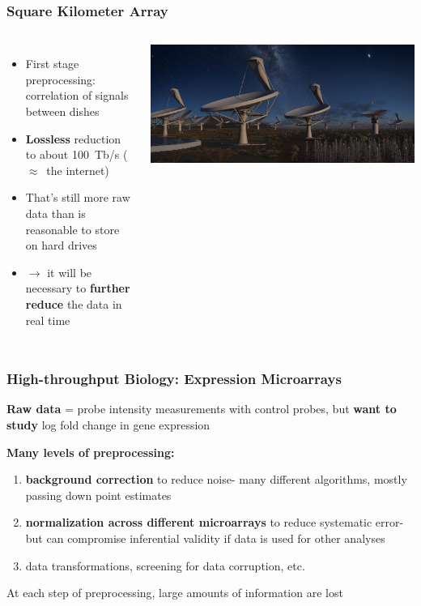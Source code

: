 \documentclass[10pt, compress]{beamer}
\begin{document}
\begin{frame}[fragile]
    \frametitle{Square Kilometer Array}
    \begin{columns}
    		\begin{itemize}
        		\item First stage preprocessing: correlation of signals between dishes
        		\item \textbf{Lossless} reduction to about 100~Tb/s ($\approx$~the internet)
        		\item That's still more raw data than is reasonable to store on hard drives
        		\item $\rightarrow$ it will be necessary to \textbf{further reduce} the data in real time
    		\end{itemize}
    		\includegraphics[height=\textheight]{assets/skaall_night.jpg}
    \end{columns}
\end{frame}

\begin{frame}[fragile]
    \frametitle{High-throughput Biology: Expression Microarrays}
    
    \textbf{Raw data} = probe intensity measurements with control probes, but \textbf{want to study} log fold change in gene expression
    
    \textbf{Many levels of preprocessing:} 

    \begin{enumerate} [<+->]
    \item \textbf{background correction} to reduce noise- many different algorithms, mostly passing down point estimates
    \vspace*{5mm}
    \item \textbf{normalization across different microarrays} to reduce systematic error- but can compromise inferential validity if data is used for other analyses
    \vspace*{5mm}
    \item data transformations, screening for data corruption, etc.
    \end{enumerate}
    
    At each step of preprocessing, large amounts of information are lost

\end{frame}
\end{document}
